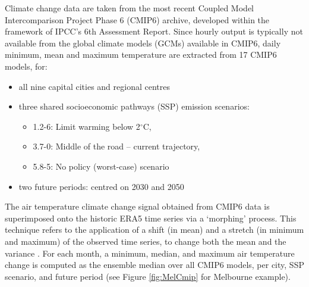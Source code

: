 \documentclass[utf8]{frontiersSCNS} %
\begin{document}
Climate change data are taken from the most recent Coupled Model Intercomparison Project Phase 6 \citep{Eyring2016} (CMIP6) archive, developed within the framework of IPCC's 6th Assessment Report\citep{IPCC2021}. Since hourly output is typically not available from the global climate models (GCMs) available in CMIP6, daily minimum, mean and maximum temperature are extracted from 17 CMIP6 models, for:

\begin{itemize}
\item all nine capital cities and regional centres
	\item three shared socioeconomic pathways (SSP) emission scenarios:
	\begin{itemize}
	\item 1.2-6: Limit warming below 2$^{\circ}$C, 
	\item 3.7-0: Middle of the road -- current trajectory, 
	\item 5.8-5: No policy (worst-case) scenario
	\end{itemize}
\item two future periods: centred on 2030 and 2050
\end{itemize}

The air temperature climate change signal obtained from CMIP6 data is superimposed onto the historic ERA5 time series via a `morphing' process. This technique refers to the application of a shift (in mean) and a stretch (in minimum and maximum) of the observed time series, to change both the mean and the variance \citep{Belcher2005,Pulkkinen2021}. For each month, a minimum, median, and maximum air temperature change is computed as the ensemble median over all CMIP6 models, per city, SSP scenario, and future period (see Figure \ref{fig:MelCmip} for Melbourne example). 
\end{document}
